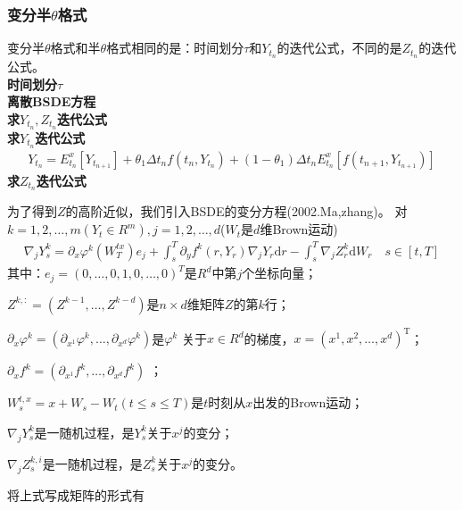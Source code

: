 		\subsubsection{变分半$\theta$格式}
			变分半$\theta$格式和半$\theta$格式相同的是：时间划分$\tau $和$Y_{t_n}$的迭代公式，不同的是$Z_{t_n}$的迭代公式。\\
			 \textbf{时间划分$\tau$}\\
			 \textbf{离散BSDE方程}\\
			 \textbf{求$Y_{t_n},Z_{t_n}$迭代公式}\\
			\checkmark \textbf{求$Y_{t_n}$迭代公式}
			 \begin{align*}
			 {Y_{{t_n}}} = E_{{t_n}}^x\left[ {{Y_{{t_{n + 1}}}}} \right] + {\theta _1}\Delta {t_n}f\left( {{t_n},{Y_{{t_n}}}} \right) + \left( {1 - {\theta _1}} \right)\Delta {t_n}E_{{t_n}}^x\left[ {f\left( {{t_{n + 1}},{Y_{{t_{n + 1}}}}} \right)} \right]
			 \end{align*}
			\checkmark \textbf{求$Z_{t_n}$迭代公式}
			\par
			为了得到$Z$的高阶近似，我们引入BSDE的变分方程(2002.Ma,zhang\cite{2002.Ma})。
			对$k=1,2,\ldots,m  (Y_t \in R^m) ,j=1,2,\ldots,d$($W_t$是$d$维Brown运动)
					\begin{align}\label{eq:1}
					{\nabla _j}Y_s^k = {\partial _x}{\varphi ^k}\left( {W_T^{tx}} \right){e_j} + \int_s^T {{\partial _y}{f^k}\left( {r,{Y_r}} \right){\nabla _j}{Y_r}\mathrm{d}r}  - \int_s^T {{\nabla _j}Z_r^k\mathrm{d}{W_r}} \quad s \in [t,T]
					\end{align}
			其中：${e _j}=(0,\ldots,0,1,0,\ldots,0)^T$是$R^d$中第$j$个坐标向量；
			\par
			$Z^{k,:}=(Z^{k-1},\ldots,Z^{k-d})$是$n \times d$维矩阵$Z$的第$k$行；
			\par
			${\partial _x}{\varphi ^k} = \left( {\partial_{x^1}{\varphi ^k}, \ldots ,\partial_{x^d}{\varphi ^k}} \right)$是$\varphi^k$ 关于$x\in R^d$的梯度，$x=(x^1,x^2,\ldots,x^d)^\mathrm{T}$；\par
			${\partial _x}{f ^k} = \left( {\partial_{x^1}{f ^k}, \ldots ,\partial_{x^d}{f ^k}} \right)$ ；
			\par
			$W_s^{t,x}=x+W_s-W_t(t \leqslant s \leqslant T)$是$t$时刻从$x$出发的Brown运动；
			\par
			${\nabla _j}Y_s^k$是一随机过程，是$Y_s^k$关于$x^j$的变分；
			\par
			${\nabla_j}Z_s^{k,i}$是一随机过程，是$Z_s^k$关于$x^j$的变分。
			\par
			将上式写成矩阵的形式有
